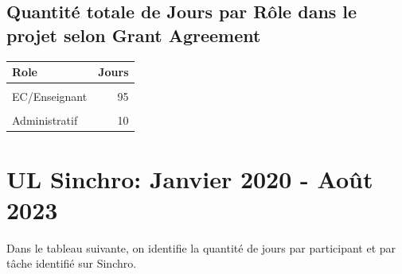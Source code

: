 \documentclass[
  a4paperpaper,
  onecolumn]{article}
\begin{document}
\hypertarget{quantituxe9-totale-de-jours-par-ruxf4le-dans-le-projet-selon-grant-agreement}{%
\subsection{Quantité totale de Jours par Rôle dans le projet selon Grant
Agreement}\label{quantituxe9-totale-de-jours-par-ruxf4le-dans-le-projet-selon-grant-agreement}}

\begin{table}[!h]
\centering\begingroup\fontsize{10}{12}\selectfont

\begin{tabular}[t]{lr}
\toprule
Role & Jours\\
\midrule
\cellcolor{gray!6}{Manager} & \cellcolor{gray!6}{11}\\
EC/Enseignant & 95\\
\cellcolor{gray!6}{Technicien} & \cellcolor{gray!6}{56}\\
Administratif & 10\\
\bottomrule
\end{tabular}
\endgroup{}
\end{table}

\hypertarget{ul-sinchro-janvier-2020---aouxfbt-2023}{%
\section{UL Sinchro: Janvier 2020 - Août
2023}\label{ul-sinchro-janvier-2020---aouxfbt-2023}}

Dans le tableau suivante, on identifie la quantité de jours par
participant et par tâche identifié sur Sinchro.
\end{document}
